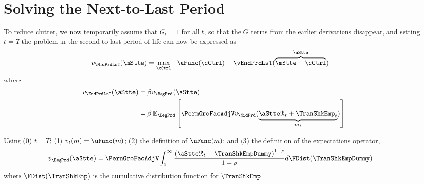 \documentclass[titlepage, headings=optiontotocandhead]{Resources/texmf-local/tex/latex/econtex}
\begin{document}
\section{Solving the Next-to-Last Period}\label{sec:solving-the-next}

To reduce clutter, we now temporarily assume that $G_{t}=1$ for all $t$, so that the $G$ terms from the earlier derivations disappear, and setting $t=T$ the problem in the second-to-last period of life can now be expressed as
\begin{equation}\begin{gathered}\begin{aligned}
  v_{\MidPrdLsT}(\mStte)  & = \max_{\cCtrl} ~~ \uFunc(\cCtrl) +
                              \vEndPrdLsT(\overbrace{\mStte-\cCtrl}^{\aStte})
                              \label{eq:vEndTm1}
\end{aligned}\end{gathered}\end{equation}
where 
\begin{equation*}\begin{gathered}\begin{aligned}
  v_{\EndPrdLsT}(\aStte)  & = \beta v_{\BegPrd}(\aStte) 
\\                          & = \beta \Ex_{\BegPrd} \left[\PermGroFacAdjV v_{\MidPrd}(\underbrace{\aStte \mathcal{R}_{t} + \TranShkEmp_{t}}_{{m}_{t}})\right]
    \end{aligned}\end{gathered}\end{equation*}



Using (0) $t=T$; (1) $v_{t}(m)=\uFunc(m)$; (2) the definition of $\uFunc(m)$; and (3) the definition of the expectations operator,  %
\begin{equation}\begin{gathered}\begin{aligned}
      v_{\BegPrd}(\aStte)   & = \PermGroFacAdjV\int_{0}^{\infty} \frac{\left(\aStte \mathcal{R}_{t}+ \TranShkEmpDummy\right)^{1-\rho}}{1-\rho}  d\FDist(\TranShkEmpDummy) \label{eq:NumDefInt}
    \end{aligned}\end{gathered}\end{equation}
where $\FDist(\TranShkEmp)$ is the cumulative distribution function for ${\TranShkEmp}$.
\end{document}
